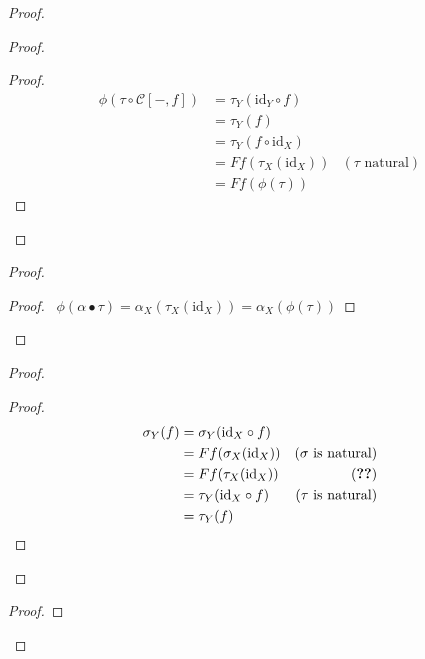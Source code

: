 \documentclass{book}
\theoremstyle{definition}
\newcommand{\id}[1]{\ensuremath{\mathrm{id}_{#1}}}
\newcommand{\Set}{\ensuremath{\mathbf{Set}}}
\newcommand{\op}[1]{\ensuremath{{#1}^{\mathrm{op}}}}
\begin{document}
\begin{proof}
\pf
{}
\begin{proof}
	\pf
	\begin{proof}
		\pf
		\begin{align*}
			\phi(\tau \circ \mathcal{C}[-,f])
			& = \tau_Y(\id{Y} \circ f) \\
			& = \tau_Y(f) \\
			& = \tau_Y(f \circ \id{X}) \\
			& = Ff(\tau_X(\id{X})) & (\text{$\tau$ natural}) \\
			& = Ff(\phi(\tau))
		\end{align*}
	\end{proof}
\end{proof}
\begin{proof}
	\step{a}{\pflet{$\alpha : F \Rightarrow G : \op{\mathcal{C}} \rightarrow \Set$}}
	\begin{proof}
		\pf\ $\phi(\alpha \bullet \tau) = \alpha_X(\tau_X(\id{X})) = \alpha_X(\phi(\tau))$
	\end{proof}
\end{proof}
\begin{proof}
	\begin{proof}
		\pf
		\begin{align*}
			\sigma_Y(f) & = \sigma_Y(\id{X} \circ f) \\
			& = Ff(\sigma_X(\id{X})) & (\text{$\sigma$ is natural}) \\
			& = Ff(\tau_X(\id{X})) & (\text{\stepref{b}}) \\
			& = \tau_Y(\id{X} \circ f) & (\text{$\tau$ is natural}) \\
			& = \tau_Y(f)
		\end{align*}
	\end{proof}
\end{proof}
\begin{proof}

\end{proof}
\end{proof}
\end{document}
